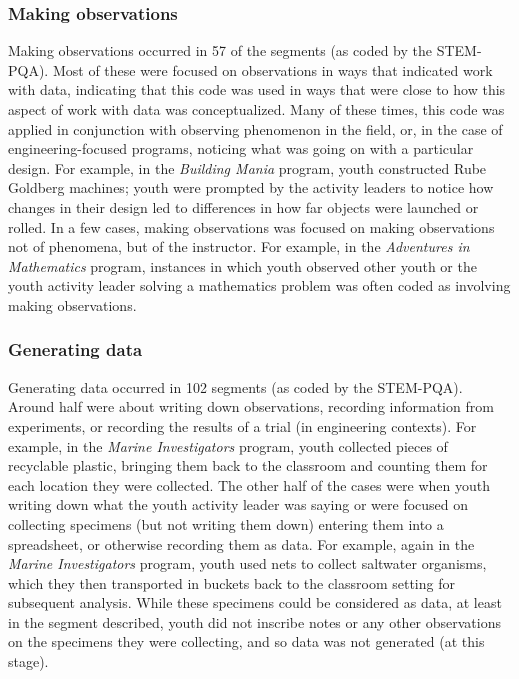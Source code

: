 \documentclass[]{book}
\theoremstyle{definition}
\theoremstyle{definition}
\theoremstyle{definition}
\theoremstyle{remark}
\begin{document}
\subsubsection{Making observations}\label{making-observations}

Making observations occurred in 57 of the segments (as coded by the
STEM-PQA). Most of these were focused on observations in ways that
indicated work with data, indicating that this code was used in ways
that were close to how this aspect of work with data was conceptualized.
Many of these times, this code was applied in conjunction with observing
phenomenon in the field, or, in the case of engineering-focused
programs, noticing what was going on with a particular design. For
example, in the \emph{Building Mania} program, youth constructed Rube
Goldberg machines; youth were prompted by the activity leaders to notice
how changes in their design led to differences in how far objects were
launched or rolled. In a few cases, making observations was focused on
making observations not of phenomena, but of the instructor. For
example, in the \emph{Adventures in Mathematics} program, instances in
which youth observed other youth or the youth activity leader solving a
mathematics problem was often coded as involving making observations.

\subsubsection{Generating data}\label{generating-data}

Generating data occurred in 102 segments (as coded by the STEM-PQA).
Around half were about writing down observations, recording information
from experiments, or recording the results of a trial (in engineering
contexts). For example, in the \emph{Marine Investigators} program,
youth collected pieces of recyclable plastic, bringing them back to the
classroom and counting them for each location they were collected. The
other half of the cases were when youth writing down what the youth
activity leader was saying or were focused on collecting specimens (but
not writing them down) entering them into a spreadsheet, or otherwise
recording them as data. For example, again in the \emph{Marine
Investigators} program, youth used nets to collect saltwater organisms,
which they then transported in buckets back to the classroom setting for
subsequent analysis. While these specimens could be considered as data,
at least in the segment described, youth did not inscribe notes or any
other observations on the specimens they were collecting, and so data
was not generated (at this stage).
\end{document}
